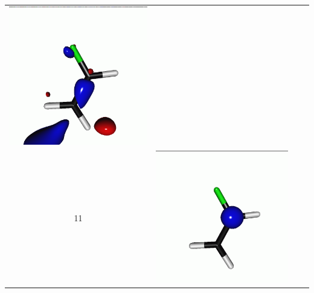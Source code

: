 \documentclass[journal=jctcce,manuscript=article]{achemso}
\begin{document}
\begin{table}[H]
\begin{tabular}{ c | c c c }
\begin{minipage}{0.2\textwidth}
         \includegraphics[scale=0.10]{NTO/CH2CHF/8p_019.png}
     \end{minipage}
     \\
                  11 &  
     \begin{minipage}{0.2\textwidth}
         \centering
         \includegraphics[scale=0.10]{NTO/CH2CHF/11h.png}

\end{minipage}
\end{tabular}
\end{table}
\end{document}
